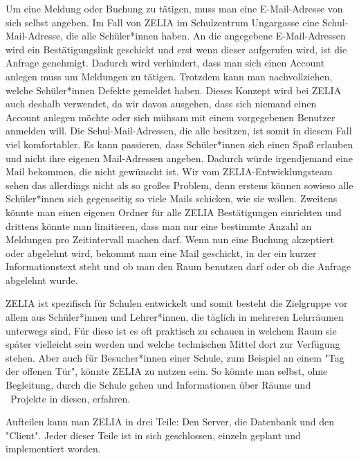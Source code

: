 Um eine Meldung oder Buchung zu tätigen, muss man eine E-Mail-Adresse von sich selbst angeben. Im Fall von ZELIA im Schulzentrum Ungargasse eine Schul-Mail-Adresse, die alle Schüler*innen haben. An die angegebene E-Mail-Adressen wird ein Bestätigungslink geschickt und erst wenn dieser aufgerufen wird, ist die Anfrage genehmigt. Dadurch wird verhindert, dass man sich einen Account anlegen muss um Meldungen zu tätigen. Trotzdem kann man nachvollziehen, welche Schüler*innen Defekte gemeldet haben. Dieses Konzept wird bei ZELIA auch deshalb verwendet, da wir davon ausgehen, dass sich niemand einen Account anlegen möchte oder sich mühsam mit einem vorgegebenen Benutzer anmelden will. Die Schul-Mail-Adressen, die alle besitzen, ist somit in diesem Fall viel komfortabler. Es kann passieren, dass Schüler*innen sich einen Spaß erlauben und nicht ihre eigenen Mail-Adressen angeben. Dadurch würde irgendjemand eine Mail bekommen, die nicht gewünscht ist. Wir vom ZELIA-Entwicklungsteam sehen das allerdings nicht als so großes Problem, denn erstens können sowieso alle Schüler*innen sich gegenseitig so viele Mails schicken, wie sie wollen. Zweitens könnte man einen eigenen Ordner für alle ZELIA Bestätigungen einrichten und drittens könnte man limitieren, dass man nur eine bestimmte Anzahl an Meldungen pro Zeitintervall machen darf. Wenn nun eine Buchung akzeptiert oder abgelehnt wird, bekommt man eine Mail geschickt, in der ein kurzer Informationstext steht und ob man den Raum benutzen darf oder ob die Anfrage abgelehnt wurde.

ZELIA ist spezifisch für Schulen entwickelt und somit besteht die Zielgruppe vor allem aus Schüler*innen und Lehrer*innen, die täglich in mehreren Lehrräumen unterwegs sind. Für diese ist es oft praktisch zu schauen in welchem Raum sie später vielleicht sein werden und welche technischen Mittel dort zur Verfügung stehen. Aber auch für Besucher*innen einer Schule, zum Beispiel an einem "Tag der offenen Tür", könnte ZELIA zu nutzen sein. So könnte man selbst, ohne Begleitung, durch die Schule gehen und Informationen über Räume und \zb\ Projekte in diesen, erfahren.

Aufteilen kann man ZELIA in drei Teile: Den Server, die Datenbank und den "Client". Jeder dieser Teile ist in sich geschlossen, einzeln geplant und implementiert worden.

